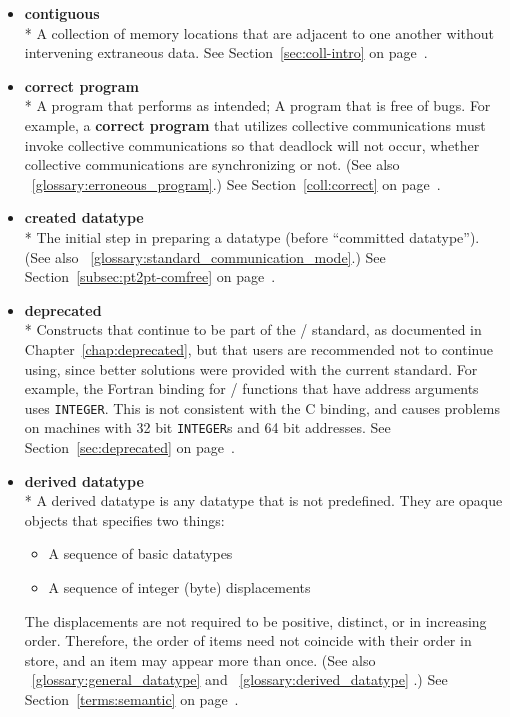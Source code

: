 \begin{itemize}
\label{glossary:contiguous}
\item \textbf{ contiguous} \\*
A collection of memory locations that are adjacent to one another
without intervening extraneous data.
See Section~\ref{sec:coll-intro} on page~\pageref{sec:coll-intro}.

\label{glossary:correct_program}
\item \textbf{ correct program} \\*
A program that performs as intended; A program that is free of bugs. 
For example, a  {\bf correct program} that utilizes collective communications
must invoke collective communications so
that deadlock will
not occur, whether collective communications are synchronizing or not.
(See also ~\ref{glossary:erroneous_program}.)
See Section~\ref{coll:correct} on page~\pageref{coll:correct}.

\label{glossary:created_datatype}
\item \textbf{ created datatype} \\*
The initial step in preparing a datatype (before ``committed datatype'').
(See also ~\ref{glossary:standard_communication_mode}.)
See Section~\ref{subsec:pt2pt-comfree} on page~\pageref{subsec:pt2pt-comfree}.

\label{glossary:deprecated}
\item \textbf{deprecated} \\*
Constructs that continue to be part of the \MPI/ standard, 
as documented in Chapter~\ref{chap:deprecated}, 
but that users are recommended not to continue using, since 
better solutions were provided with the current standard.
For example, the Fortran binding 
for \mpii/ functions that have address arguments uses {\tt INTEGER}.
This is not consistent with the C binding, and causes problems on
machines with 32 bit {\tt INTEGER}s and 64 bit addresses.
See Section~\ref{sec:deprecated} on page~\pageref{sec:deprecated}.

\label{glossary:derived_datatype}
\item \textbf{ derived datatype} \\*
A derived datatype is any datatype that is not predefined.
They are opaque objects that specifies two
things:
\begin{itemize}
\item
A sequence of basic datatypes
\item
A sequence of integer (byte) displacements
\end{itemize}
The displacements are not required to be positive, distinct, or
in increasing order. Therefore, the order of items need not
coincide with their order in store, and an item may appear more than
once. (See also ~\ref{glossary:general_datatype} and ~\ref{glossary:derived_datatype} .)
See Section~\ref{terms:semantic} on page~\pageref{terms:semantic}.


\end{itemize}
